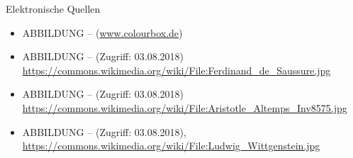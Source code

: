 \begin{frame}[allowframebreaks]{Elektronische Quellen}
\small

\begin{itemize}
	\item ABBILDUNG --  (\url{www.colourbox.de})
	\item ABBILDUNG --  (Zugriff: 03.08.2018) \url{https://commons.wikimedia.org/wiki/File:Ferdinand_de_Saussure.jpg}
	\item ABBILDUNG --  (Zugriff: 03.08.2018) \url{https://commons.wikimedia.org/wiki/File:Aristotle_Altemps_Inv8575.jpg}
	\item ABBILDUNG --  (Zugriff: 03.08.2018), \url{https://commons.wikimedia.org/wiki/File:Ludwig_Wittgenstein.jpg}
\end{itemize}

\end{frame}


%
%
%
%
